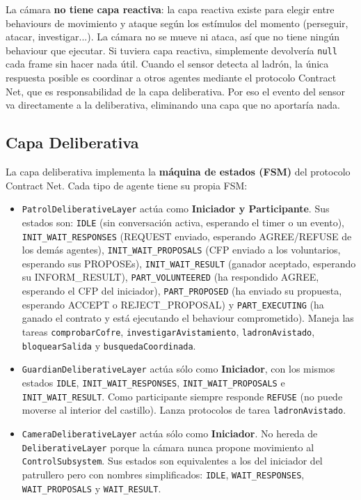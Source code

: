 \documentclass[a4paper,12pt]{article}
\begin{document}
La cámara \textbf{no tiene capa reactiva}: la capa reactiva existe para elegir entre
behaviours de movimiento y ataque según los estímulos del momento (perseguir, atacar,
investigar...). La cámara no se mueve ni ataca, así que no tiene ningún behaviour que
ejecutar. Si tuviera capa reactiva, simplemente devolvería \texttt{null} cada frame sin
hacer nada útil. Cuando el sensor detecta al ladrón, la única respuesta posible es
coordinar a otros agentes mediante el protocolo Contract Net, que es responsabilidad de
la capa deliberativa. Por eso el evento del sensor va directamente a la deliberativa,
eliminando una capa que no aportaría nada.

\subsection*{Capa Deliberativa}

La capa deliberativa implementa la \textbf{máquina de estados (FSM)} del protocolo Contract Net. Cada tipo de agente tiene su propia FSM:

\begin{itemize}
    \item \texttt{PatrolDeliberativeLayer} actúa como \textbf{Iniciador y Participante}. Sus
    estados son: \texttt{IDLE} (sin conversación activa, esperando el timer o un evento),
    \texttt{INIT\_WAIT\_RESPONSES} (REQUEST enviado, esperando AGREE/REFUSE de los demás agentes),
    \texttt{INIT\_WAIT\_PROPOSALS} (CFP enviado a los voluntarios, esperando sus PROPOSEs),
    \texttt{INIT\_WAIT\_RESULT} (ganador aceptado, esperando su INFORM\_RESULT),
    \texttt{PART\_VOLUNTEERED} (ha respondido AGREE, esperando el CFP del iniciador),
    \texttt{PART\_PROPOSED} (ha enviado su propuesta, esperando ACCEPT o REJECT\_PROPOSAL)
    y \texttt{PART\_EXECUTING} (ha ganado el contrato y está ejecutando el behaviour comprometido).
    Maneja las tareas \texttt{comprobarCofre}, \texttt{investigarAvistamiento},
    \texttt{ladronAvistado}, \texttt{bloquearSalida} y \texttt{busquedaCoordinada}.

    \item \texttt{GuardianDeliberativeLayer} actúa sólo como \textbf{Iniciador}, con los mismos
    estados \texttt{IDLE}, \texttt{INIT\_WAIT\_RESPONSES}, \texttt{INIT\_WAIT\_PROPOSALS} e
    \texttt{INIT\_WAIT\_RESULT}. Como participante siempre responde \texttt{REFUSE} (no puede
    moverse al interior del castillo). Lanza protocolos de tarea
    \texttt{ladronAvistado}.

    \item \texttt{CameraDeliberativeLayer} actúa sólo como \textbf{Iniciador}. No hereda de
    \texttt{DeliberativeLayer} porque la cámara nunca propone movimiento al
    \texttt{ControlSubsystem}. Sus estados son equivalentes a los del iniciador del patrullero
    pero con nombres simplificados: \texttt{IDLE}, \texttt{WAIT\_RESPONSES},
    \texttt{WAIT\_PROPOSALS} y \texttt{WAIT\_RESULT}.
\end{itemize}
\end{document}
